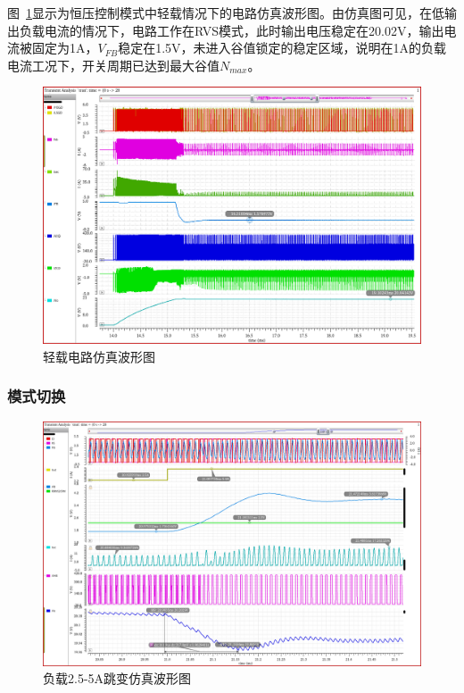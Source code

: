 图~\ref{fig:轻载工况仿真波形图}显示为恒压控制模式中轻载情况下的电路仿真波形图。由仿真图可见，在低输出负载电流的情况下，电路工作在RVS模式，此时输出电压稳定在20.02V，输出电流被固定为1A，$V_{FB}$稳定在1.5V，未进入谷值锁定的稳定区域，说明在1A的负载电流工况下，开关周期已达到最大谷值$N_{max}$。


\begin{figure}[htbp] 
    \centering
    \includegraphics[width=0.8\linewidth]{figures/1A.png}
    \caption{轻载电路仿真波形图}
    \label{fig:轻载工况仿真波形图}
\end{figure} 


\subsubsection{模式切换}

\begin{figure}[htbp] 
    \centering
    \includegraphics[width=0.8\linewidth]{figures/2.5A_ 5A.png}
    \caption{负载2.5-5A跳变仿真波形图}
    \label{fig:负载2.5_5A跳变仿真波形图}
\end{figure} 

